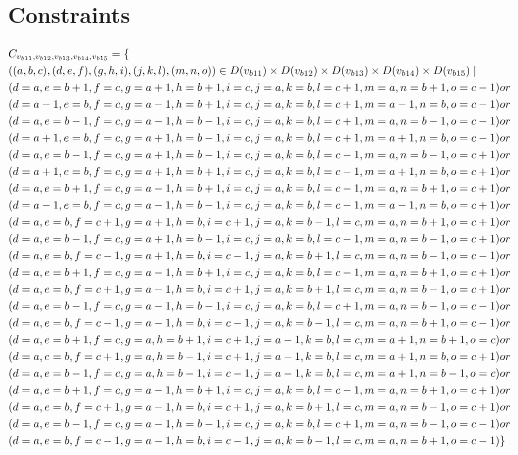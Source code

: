 \subsection{Constraints}
\begin{small}
\begin{align*}
&C_{v_{b11},v_{b12},v_{b13},v_{b14},v_{b15}}=\{\\
&((a,b,c),(d,e,f),(g,h,i),(j,k,l),(m,n,o))\in D(v_{b11}) \times D(v_{b12})\times D(v_{b13})\times D(v_{b14})\times D(v_{b15}) \mid\\
&(d=a , e=b+1,f=c , g=a+1,h=b+1,i=c ,j=a ,k=b ,l=c+1,m=a ,n=b+1,o=c-1)or\\
&(d=a-1,e=b , f=c,g=a-1,h=b+1,i=c ,j=a ,k=b ,l=c+1,m=a-1,n=b ,o=c-1)or\\
&(d=a , e=b-1,f=c , g=a-1,h=b-1,i=c ,j=a ,k=b ,l=c+1,m=a ,n=b-1,o=c-1)or\\
&(d=a+1,e=b , f=c , g=a+1,h=b-1,i=c ,j=a ,k=b ,l=c+1,m=a+1,n=b ,o=c-1)or\\
&(d=a , e=b-1, f=c , g=a+1,h=b-1,i=c ,j=a ,k=b ,l=c-1,m=a ,n=b-1,o=c+1)or\\
&(d=a+1,e=b , f=c , g=a+1,h=b+1,i=c ,j=a ,k=b ,l=c-1,m=a+1,n=b ,o=c+1)or\\
&(d=a , e=b+1, f=c , g=a-1,h=b+1,i=c ,j=a ,  k=b ,l=c-1,m=a ,n=b+1,o=c+1)or\\
&(d=a-1,e=b ,f=c , g=a-1,h=b-1,i=c ,j=a ,k=b ,l=c-1,m=a-1,n=b ,o=c+1)or\\
&(d=a ,e=b ,f=c+1, g=a+1,h=b ,i=c+1 ,j=a ,k=b-1,l=c ,m=a ,n=b+1,o=c+1)or\\
&(d=a ,e=b-1,f=c , g=a+1,h=b-1,i=c  ,j=a ,k=b ,l=c-1,m=a ,n=b-1,o=c+1)or\\
&(d=a ,e=b ,f=c-1, g=a+1,h=b ,i=c-1 ,j=a ,k=b+1,l=c ,m=a ,n=b-1,o=c-1)or\\
&(d=a ,e=b+1,f=c , g=a-1,h=b+1,i=c  ,j=a ,k=b ,l=c-1,m=a ,n=b+1,o=c+1)or\\
&(d=a ,e=b ,f=c+1, g=a-1,h=b ,i=c+1 ,j=a ,k=b+1,l=c ,m=a ,n=b-1,o=c+1)or\\
&(d=a ,e=b-1,f=c , g=a-1,h=b-1,i=c  ,j=a ,k=b ,l=c+1,m=a ,n=b-1,o=c-1)or\\
&(d=a ,e=b ,f=c-1, g=a-1,h=b ,i=c-1 ,j=a ,k=b-1,l=c ,m=a ,n=b+1,o=c-1)or\\
&(d=a ,e=b+1,f=c , g=a ,h=b+1,i=c+1 ,j=a-1,k=b ,l=c ,m=a+1,n=b+1,o=c )or\\
&(d=a ,e=b ,f=c+1, g=a ,h=b-1,i=c+1 ,j=a-1,k=b ,l=c ,m=a+1,n=b ,o=c+1)or\\
&(d=a ,e=b-1,f=c , g=a ,h=b-1,i=c-1 ,j=a-1,k=b ,l=c ,m=a+1,n=b-1,o=c )or\\
&(d=a ,e=b+1,f=c , g=a-1,h=b+1,i=c  ,j=a ,k=b ,l=c-1,m=a ,n=b+1,o=c+1)or\\
&(d=a ,e=b ,f=c+1, g=a-1,h=b ,i=c+1 ,j=a ,k=b+1,l=c ,m=a ,n=b-1,o=c+1)or\\
&(d=a ,e=b-1,f=c , g=a-1,h=b-1,i=c  ,j=a ,k=b ,l=c+1,m=a ,n=b-1,o=c-1)or\\
&(d=a ,e=b ,f=c-1, g=a-1,h=b ,i=c-1,j=a ,k=b-1,l=c ,m=a ,n=b+1,o=c-1)\}
\end{align*}
\end{small}
